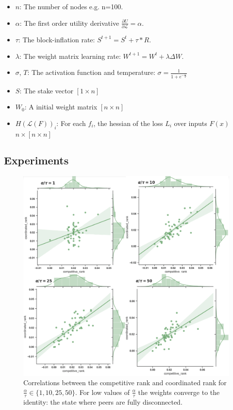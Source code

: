 \documentclass{article}
\begin{document}
\begin{itemize}
  \item $n$: The number of nodes e.g. n=100. 
  \item $\alpha$: The first order utility derivative $\frac{\partial U}{\partial \mathcal{L}} = \alpha$.
  \item $\tau$: The block-inflation rate: $S^{t+1} = S^t + \tau * R$.
  \item $\lambda$: The weight matrix learning rate: $W^{t+1} = W^t + \lambda \Delta W$.
  \item $\sigma$, $T$: The activation function and temperature: $\sigma =  \frac{1}{ 1 + e^{-\frac{x}{T}} }$
  \item $S$: The stake vector $[1 \times n]$
  \item $W_0$: A initial weight matrix $ [n \times n]$
  \item $H( \mathcal{L}(F))_i$: For each $f_i$, the hessian of the loss $L_i$ over inputs $F(x)$ $ n \times [n \times n]$
\end{itemize}

\subsection{Experiments}

\begin{figure}[!htb]
	\centering
	\includegraphics[scale=.34]{images/c_vs_c_nice.png}
	\caption{Correlations between the competitive rank and coordinated rank for $\frac{\alpha}{\tau} \in \{1, 10, 25, 50\}$. For low values of $\frac{\alpha}{\tau}$ the weights converge to the identity: the state where peers are fully disconnected. }
	\label{coordvscomp}
\end{figure}
\smallskip
\end{document}
